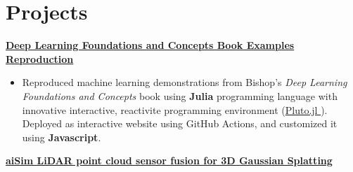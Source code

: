 \documentclass[a4paper,11pt]{article}
\newcommand{\linkicon}{{\footnotesize\faExternalLink*}}
\begin{document}

\vspace{-0.5em}
\section{Projects}
\vspace{-0.5em}

\href{https://mendebadra.github.io/IntroML.jl/sin_func_interpolation_no_pkg_env_need.html}
{\textbf{Deep Learning Foundations and Concepts Book Examples Reproduction \linkicon}}

\begin{itemize}[nosep,after=\strut,leftmargin=1em,itemsep=3pt,label=--]
  \item Reproduced machine learning demonstrations from  Bishop's \textit{Deep Learning Foundations and Concepts} book using \textbf{Julia} programming language with innovative interactive, reactivite programming environment (\href{https://github.com/JuliaPluto/Pluto.jl}{Pluto.jl \linkicon}). Deployed as interactive website using GitHub Actions, and customized  it using \textbf{Javascript}.
    
\end{itemize}
\vspace{-1.0em}
\href{https://github.com/MendeBadra/aisim2nerfstudio}
{\textbf{aiSim LiDAR point cloud sensor fusion for 3D Gaussian Splatting \linkicon}}
\end{document}
